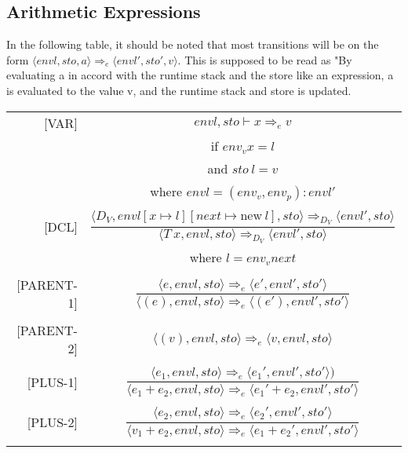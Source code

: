 \subsection{Arithmetic Expressions}
In the following table, it should be noted that most transitions will be on the form \( \langle envl, sto, a \rangle \Rightarrow_e \langle envl', sto', v \rangle \). This is supposed to be read as "By evaluating a in accord with the runtime stack and the store like an expression, a is evaluated to the value v, and the runtime stack and store is updated.
\newline
\begin{longtable}[c] { r c }
  \centering
  
  [VAR] & \( envl, sto \vdash x \Rightarrow_e v \) \\
  & if \(env_v x = l \) \\
  & and \(sto \ l = v \) \\
  & where \(envl = (env_v, env_p) : envl' \) \\
  &  \\

  [DCL] & \( 
    \dfrac{ \langle D_V, envl[x \mapsto l][next \mapsto \text{new} \ l], sto \rangle \Rightarrow_{D_V} \langle envl', sto \rangle}
    { \langle T\ x, envl, sto \rangle \Rightarrow_{D_V} \langle envl', sto \rangle } \) \\
    & where \( l = env_v next \) \\
  & \\

  [PARENT-1] & 
    \( \dfrac { \langle e, envl, sto \rangle \Rightarrow_e \langle e', envl', sto' \rangle }
      { \langle (e), envl, sto \rangle  \Rightarrow_e \langle (e'), envl', sto' \rangle } \) \\
  & \\

  [PARENT-2] & 
    \( \langle (v), envl, sto \rangle \Rightarrow_e \langle v, envl, sto \rangle \) \\
  & \\

  [PLUS-1] & 
    \( \dfrac { \langle e_1, envl, sto \rangle \Rightarrow_e \langle e_1', envl', sto' \rangle )}
      {\langle e_1 + e_2, envl, sto \rangle \Rightarrow_e \langle e_1' + e_2, envl', sto' \rangle } \) \\
  & \\

  [PLUS-2] & 
    \( \dfrac { \langle e_2, envl, sto \rangle \Rightarrow_e \langle e_2', envl', sto' \rangle }
      {\langle v_1 + e_2, envl, sto \rangle  \Rightarrow_e \langle e_1 + e_2', envl', sto' \rangle } \) \\
  & \\


\end{longtable}
